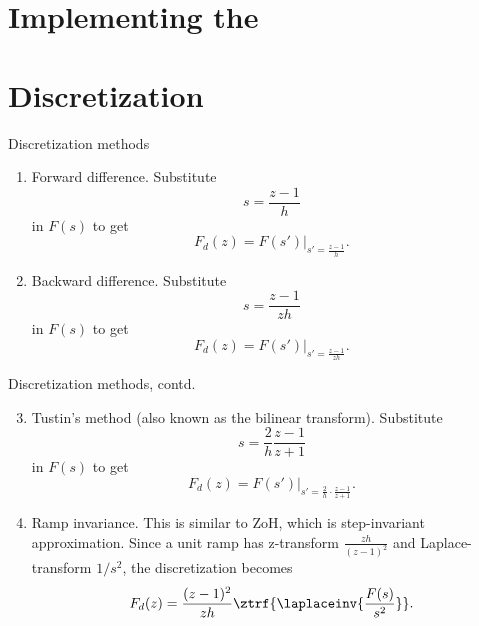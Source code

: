 \documentclass[presentation,aspectratio=1610]{beamer}
\begin{document}
\section{Implementing the}
\label{sec:org264108b}
\section{Discretization}
\label{sec:orgd2bf2ae}
\begin{frame}[label={sec:orgdab3b62}]{Discretization methods}
\begin{enumerate}
\item Forward difference. Substitute 
\[ s = \frac{z-1}{h} \] in \(F(s)\) to get
\[ F_d(z) = F(s')|_{s'=\frac{z-1}{h}}. \]
\item Backward difference. Substitute 
\[ s = \frac{z-1}{zh} \] in \(F(s)\) to get
\[ F_d(z) = F(s')|_{s'=\frac{z-1}{zh}}. \]
\end{enumerate}
\end{frame}
\begin{frame}[label={sec:org2bf68ab}]{Discretization methods, contd.}
\begin{enumerate}
\setcounter{enumi}{2}
\item Tustin's method (also known as the bilinear transform). Substitute
\[ s = \frac{2}{h}\frac{z-1}{z+1} \] in \(F(s)\) to get
\[ F_d(z) = F(s')|_{s'=\frac{2}{h}\cdot \frac{z-1}{z+1}}. \]
\item Ramp invariance. This is similar to ZoH, which is step-invariant approximation. 
Since a unit ramp has z-transform \(\frac{zh}{(z-1)^2}\) and Laplace-transform \(1/s^2\),  the discretization becomes
\[ F_d(z) = \frac{(z-1)^2}{zh} \ztrf{\laplaceinv{\frac{F(s)}{s^2}}}. \]
\end{enumerate}
\end{frame}
\end{document}
